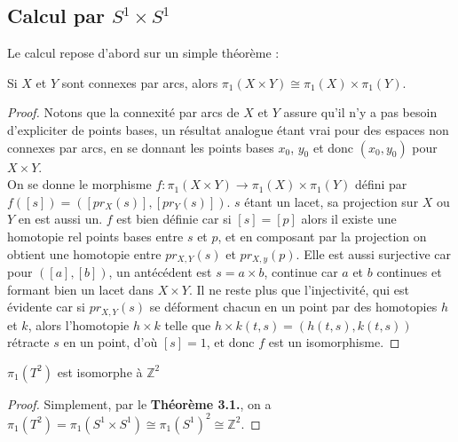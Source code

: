 \subsection{Calcul par $S^1\times S^1$}
Le calcul repose d'abord sur un simple théorème :
\begin{theoreme}
    Si $X$ et $Y$ sont connexes par arcs, alors $\pi_1(X\times Y)\cong\pi_1(X)\times\pi_1(Y)$.
\end{theoreme}
\begin{proof}
    Notons que la connexité par arcs de $X$ et $Y$ assure qu'il n'y a pas besoin d'expliciter de points bases, un résultat analogue étant vrai pour des espaces non connexes par arcs, en se donnant les points bases $x_0$, $y_0$ et donc $(x_0,y_0)$ pour $X\times Y$.\medskip\\
    On se donne le morphisme $f:\pi_1(X\times Y)\to\pi_1(X)\times\pi_1(Y)$ défini par $f([s])=([pr_X(s)],[pr_Y(s)])$. $s$ étant un lacet, sa projection sur $X$ ou $Y$ en est aussi un. $f$ est bien définie car si $[s]=[p]$ alors il existe une homotopie rel points bases entre $s$ et $p$, et en composant par la projection on obtient une homotopie entre $pr_{X,Y}(s)$ et $pr_{X,y}(p)$. Elle est aussi surjective car pour $([a],[b])$, un antécédent est $s=a\times b$, continue car $a$ et $b$ continues et formant bien un lacet dans $X\times Y$. Il ne reste plus que l'injectivité, qui est évidente car si $pr_{X,Y}(s)$ se déforment chacun en un point par des homotopies $h$ et $k$, alors l'homotopie $h\times k$ telle que $h\times k(t,s)=(h(t,s),k(t,s))$ rétracte $s$ en un point, d'où $[s]=1$, et donc $f$ est un isomorphisme.
\end{proof}
\begin{corollaire}
    $\pi_1(T^2)$ est isomorphe à $\mathbb{Z}^2$
\end{corollaire}
\begin{proof}
    Simplement, par le \textbf{Théorème 3.1.}, on a $\pi_1(T^2)=\pi_1(S^1\times S^1)\cong\pi_1(S^1)^2\cong\mathbb{Z}^2$.
\end{proof}
